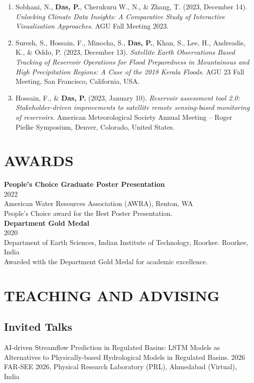 \documentclass[a4paper,9pt]{extarticle}
\begin{document}
\begin{enumerate}
        \item Sobhani, N., \textbf{Das, P.}, Cherukuru W., N., \& Zhang, T. (2023, December 14). \textit{Unlocking Climate Data Insights: A Comparative Study of Interactive Visualization Approaches}. AGU Fall Meeting 2023.

        \item Suresh, S., Hossain, F., Minocha, S., \textbf{Das, P.}, Khan, S., Lee, H., Andreadis, K., \& Oddo, P. (2023, December 13). \textit{Satellite Earth Observations Based Tracking of Reservoir Operations for Flood Preparedness in Mountainous and High Precipitation Regions: A Case of the 2018 Kerala Floods}. AGU 23 Fall Meeting, San Francisco, California, USA.

        \item Hossain, F., \& \textbf{Das, P.} (2023, January 10). \textit{Reservoir assessment tool 2.0: Stakeholder-driven improvements to satellite remote sensing-based monitoring of reservoirs}. American Meteorological Society Annual Meeting -- Roger Pielke Symposium, Denver, Colorado, United States.
    \end{enumerate}

\section*{AWARDS}
    \noindent
    \newline
    \textbf{People's Choice Graduate Poster Presentation} \\
    2022 \\
    American Water Resources Association (AWRA), Renton, WA \\
    People's Choice award for the Best Poster Presentation. \\

    \noindent
    \textbf{Department Gold Medal} \\
    2020 \\
    Department of Earth Sciences, Indian Institute of Technology, Roorkee. Roorkee, India \\
    Awarded with the Department Gold Medal for academic excellence.

\section*{TEACHING AND ADVISING}    

    \subsection*{Invited Talks}
    \noindent
    AI-driven Streamflow Prediction in Regulated Basins: LSTM Models as Alternatives to Physically-based Hydrological Models in Regulated Basins. 2026 \\
    FAR-SEE 2026, Physical Research Laboratory (PRL), Ahmedabad (Virtual), India \\
\end{document}
